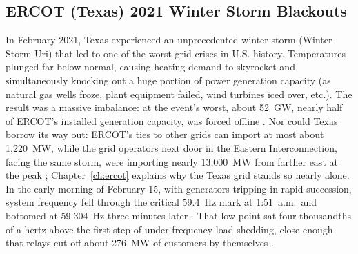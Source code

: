 \subsection{ERCOT (Texas) 2021 Winter Storm Blackouts}

In February 2021, Texas experienced an unprecedented winter storm (Winter Storm Uri) that led to one of the worst grid crises in U.S. history. Temperatures plunged far below normal, causing heating demand to skyrocket and simultaneously knocking out a huge portion of power generation capacity (as natural gas wells froze, plant equipment failed, wind turbines iced over, etc.). The result was a massive imbalance: at the event's worst, about 52~GW, nearly half of ERCOT's installed generation capacity, was forced offline \autocite{ERCOTUpdate2021}. %
Nor could Texas borrow its way out: ERCOT's ties to other grids can import at most about 1,220~MW, while the grid operators next door in the Eastern Interconnection, facing the same storm, were importing nearly 13,000~MW from farther east at the peak \autocite{FERCNERCFeb2021}; Chapter~\ref{ch:ercot} explains why the Texas grid stands so nearly alone. %
In the early morning of February 15, with generators tripping in rapid succession, system frequency fell through the critical 59.4~Hz mark at 1:51~a.m.\ and bottomed at 59.304~Hz three minutes later \autocite{FERCNERCFeb2021}. %
That low point sat four thousandths of a hertz above the first step of under-frequency load shedding, close enough that relays cut off about 276~MW of customers by themselves \autocite{FERCNERCFeb2021}. %
